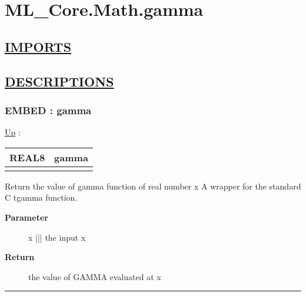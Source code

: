\chapter*{ML\_Core.Math.gamma}
\hypertarget{ecldoc:toc:ML_Core.Math.gamma}{}

\section*{\underline{IMPORTS}}

\section*{\underline{DESCRIPTIONS}}
\subsection*{EMBED : gamma}
\hypertarget{ecldoc:ml_core.math.gamma}{}
\hyperlink{ecldoc:toc:ML_Core/Math}{Up} :

{\renewcommand{\arraystretch}{1.5}
\begin{tabularx}{\textwidth}{|>{\raggedright\arraybackslash}l|X|}
\hline
\hspace{0pt}REAL8 & gamma \\
\hline
\multicolumn{2}{|>{\raggedright\arraybackslash}X|}{\hspace{0pt}(REAL8 x)} \\
\hline
\end{tabularx}
}

\par
Return the value of gamma function of real number x A wrapper for the standard C tgamma function.

\par
\begin{description}
\item [\textbf{Parameter}] x ||| the input x
\item [\textbf{Return}] the value of GAMMA evaluated at x
\end{description}

\rule{\linewidth}{0.5pt}
